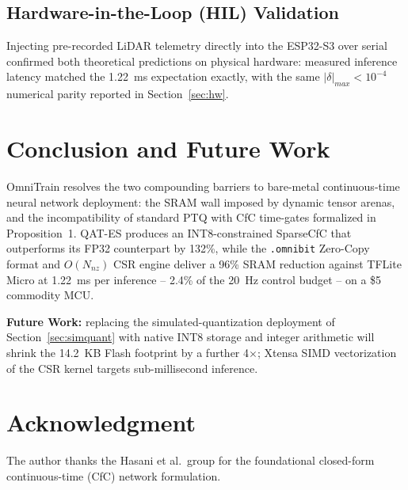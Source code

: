 \documentclass[10pt,journal]{IEEEtran}
\begin{document}
\subsection{Hardware-in-the-Loop (HIL) Validation}

Injecting pre-recorded LiDAR telemetry directly into the ESP32-S3 over serial confirmed both theoretical predictions on physical hardware: measured inference latency matched the 1.22~ms expectation exactly, with the same $|\delta|_{max}<10^{-4}$ numerical parity reported in Section~\ref{sec:hw}.

\section{Conclusion and Future Work}
\label{sec:conclusion}

OmniTrain resolves the two compounding barriers to bare-metal continuous-time neural network deployment: the SRAM wall imposed by dynamic tensor arenas, and the incompatibility of standard PTQ with CfC time-gates formalized in Proposition~1. QAT-ES produces an INT8-constrained SparseCfC that outperforms its FP32 counterpart by 132\%, while the \texttt{.omnibit} Zero-Copy format and $O(N_{nz})$ CSR engine deliver a 96\% SRAM reduction against TFLite Micro at 1.22~ms per inference -- 2.4\% of the 20~Hz control budget -- on a \$5 commodity MCU.

\textbf{Future Work:} replacing the simulated-quantization deployment of Section~\ref{sec:simquant} with native INT8 storage and integer arithmetic will shrink the 14.2~KB Flash footprint by a further 4$\times$; Xtensa SIMD vectorization of the CSR kernel targets sub-millisecond inference.

\section*{Acknowledgment}
The author thanks the Hasani et al.\ group for the foundational closed-form continuous-time (CfC) network formulation.
\end{document}

